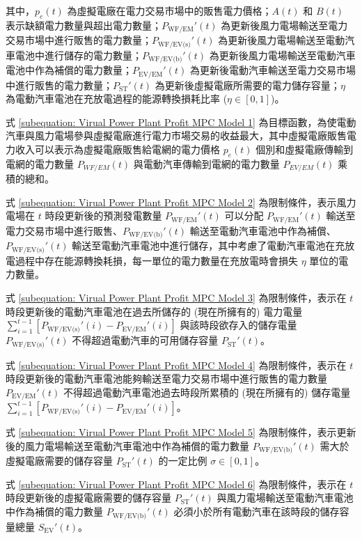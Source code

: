 %
其中，$p_{e} (t)$ 為虛擬電廠在電力交易市場中的販售電力價格；$A(t)$ 和 $B(t)$ 表示缺額電力數量與超出電力數量；$P_{\text{WF/EM}}'(t)$ 為更新後風力電場輸送至電力交易市場中進行販售的電力數量；$P_{\text{WF/EV(s)}}'(t)$ 為更新後風力電場輸送至電動汽車電池中進行儲存的電力數量；$P_{\text{WF/EV(b)}}'(t)$ 為更新後風力電場輸送至電動汽車電池中作為補償的電力數量；$P_{\text{EV/EM}}'(t)$ 為更新後電動汽車輸送至電力交易市場中進行販售的電力數量；$P_{\text{ST}}'(t)$ 為更新後虛擬電廠所需要的電力儲存容量；$\eta$ 為電動汽車電池在充放電過程的能源轉換損耗比率 ($\eta \in [0, 1]$)。

式 \eqref{subequation: Virual Power Plant Profit MPC Model 1} 為目標函數，為使電動汽車與風力電場參與虛擬電廠進行電力市場交易的收益最大，其中虛擬電廠販售電力收入可以表示為虛擬電廠販售給電網的電力價格 $p_{e} (t)$ 個別和虛擬電廠傳輸到電網的電力數量 $P_{WF/EM}(t)$ 與電動汽車傳輸到電網的電力數量 $P_{EV/EM}(t)$ 乘積的總和。

式 \eqref{subequation: Virual Power Plant Profit MPC Model 2} 為限制條件，表示風力電場在 $t$ 時段更新後的預測發電數量 $P_{\text{WF/EM}}'(t)$ 可以分配 $P_{\text{WF/EM}}'(t)$ 輸送至電力交易市場中進行販售、$P_{\text{WF/EV(b)}}'(t)$ 輸送至電動汽車電池中作為補償、$P_{\text{WF/EV(s)}}'(t)$ 輸送至電動汽車電池中進行儲存，其中考慮了電動汽車電池在充放電過程中存在能源轉換耗損，每一單位的電力數量在充放電時會損失 $\eta$ 單位的電力數量。

式 \eqref{subequation: Virual Power Plant Profit MPC Model 3} 為限制條件，表示在 $t$ 時段更新後的電動汽車電池在過去所儲存的 (現在所擁有的) 電力電量 $\sum_{i=1}^{t-1} \left[ P_{\text{WF/EV(s)}}'(i) - P_{\text{EV/EM}}'(i) \right]$ 與該時段欲存入的儲存電量 $P_{\text{WF/EV(s)}}'(t)$ 不得超過電動汽車的可用儲存容量 $P_{\text{ST}}'(t)$。

式 \eqref{subequation: Virual Power Plant Profit MPC Model 4} 為限制條件，表示在 $t$ 時段更新後的電動汽車電池能夠輸送至電力交易市場中進行販售的電力數量 $P_{\text{EV/EM}}'(t)$ 不得超過電動汽車電池過去時段所累積的 (現在所擁有的) 儲存電量 $\sum_{i=1}^{t-1} \left[ P_{\text{WF/EV(s)}}'(i) - P_{\text{EV/EM}}'(i) \right]$。

式 \eqref{subequation: Virual Power Plant Profit MPC Model 5} 為限制條件，表示更新後的風力電場輸送至電動汽車電池中作為補償的電力數量 $P_{\text{WF/EV(b)}}'(t)$ 需大於虛擬電廠需要的儲存容量 $P_{\text{ST}}'(t)$ 的一定比例 $\sigma \in [0, 1]$。

式 \eqref{subequation: Virual Power Plant Profit MPC Model 6} 為限制條件，表示在 $t$ 時段更新後的虛擬電廠需要的儲存容量 $P_{\text{ST}}'(t)$ 與風力電場輸送至電動汽車電池中作為補償的電力數量 $P_{\text{WF/EV(b)}}'(t)$ 必須小於所有電動汽車在該時段的儲存容量總量 $S_{\text{EV}}'(t)$。

